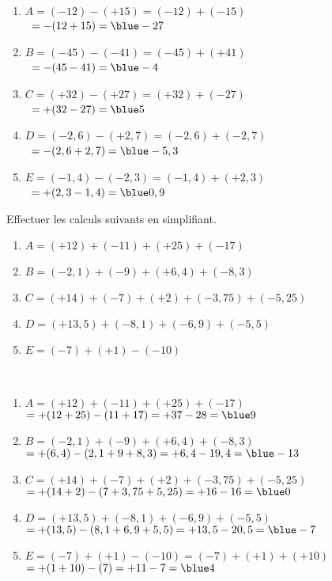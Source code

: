 \begin{colonne*exercice}
\begin{corrige}
   \ \\ [-5mm]
   \begin{enumerate}
      \item $A =(-12)-(+15)=(-12)+(-15)$ \\
         \qquad\, $=-(12+15) =\blue -27$
      \item $B =(-45)-(-41) =(-45)+(+41)$ \\
         \qquad\, $=-(45-41) =\blue -4$
      \item $C =(+32)-(+27) =(+32)+(-27)$ \\
         \qquad\, $=+(32-27) =\blue 5$
      \item $D =(-2,6)-(+2,7) =(-2,6)+(-2,7)$ \\
         \qquad\, $=-(2,6+2,7) =\blue -5,3$
      \item $E =(-1,4)-(-2,3) =(-1,4)+(+2,3)$ \\
         \qquad\, $=+(2,3-1,4) =\blue 0,9$
   \end{enumerate}
\end{corrige}

\medskip


\begin{exercice} %
   Effectuer les calculs suivants en simplifiant.
   \begin{enumerate}
      \item $A =(+12) + (-11) + (+25) + (-17)$
      \item $B = (-2,1) + (-9) + (+6,4) + (-8,3)$
      \item $C = (+14) + (-7) + (+2) + (-3,75) + (-5,25)$
      \item $D = (+13,5) + (-8,1) + (-6,9) + (-5,5)$
      \item $E=(-7)+(+1)-(-10)$
   \end{enumerate}
\end{exercice}

\begin{corrige}
   \ \\ [-5mm]
   \begin{enumerate}
      \item $A =(+12) + (-11) + (+25) + (-17)$ \\
         $=+(12+25)-(11+17) =+37-28 =\blue 9$
      \item $B = (-2,1) + (-9) + (+6,4) + (-8,3)$ \\
         $=+(6,4)-(2,1+9+8,3) =+6,4-19,4 =\blue -13$
      \item $C = (+14) + (-7) + (+2) + (-3,75) + (-5,25)$ \\
         $=+(14+2)-(7+3,75+5,25) =+16-16 ={\blue 0}$
      \item $D = (+13,5) + (-8,1) + (-6,9) + (-5,5)$ \\
         $=+(13,5)-(8,1+6,9+5,5) =+13,5-20,5 =\blue -7$
      \item $E=(-7)+(+1)-(-10) =(-7)+(+1)+(+10)$ \\
         $=+(1+10)-(7) =+11-7 =\blue 4$
   \end{enumerate}
\end{corrige}


\end{colonne*exercice}
